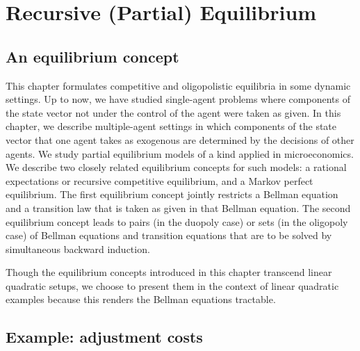 

%





\def\toone{{t+1}}
\def\ttwo{{t+2}}
\def\tthree{{t+3}}
\def\Tone{{T+1}}
\def\TTT{{T-1}}
\def\rtr{{\rm tr}}

\chapter{Recursive (Partial) Equilibrium \label{recurpe}}

\section{An equilibrium concept}

This chapter formulates competitive and oligopolistic
equilibria in some dynamic settings.
Up to now, we have studied  single-agent problems where
components of the state vector not under the control
of the agent were taken as given.  In this chapter, we
describe multiple-agent settings in which  components
of the state vector that one agent takes as exogenous are
determined by the decisions of other agents.   We study partial
equilibrium models of a kind applied in
microeconomics.    We describe
two closely related equilibrium  concepts for such models:
a rational expectations or recursive competitive  equilibrium,
and a Markov perfect equilibrium.   The first
equilibrium concept jointly restricts a Bellman equation and
a transition law that is taken as given in that Bellman
equation.  The second equilibrium concept leads
to pairs (in the duopoly case) or sets (in the oligopoly case)
 of Bellman equations  and transition equations that are  to be
solved by simultaneous backward induction.

   Though the equilibrium concepts introduced in this chapter
 transcend  linear quadratic setups, we choose to
present them in the context of linear quadratic examples
because this renders the    Bellman equations
 tractable.


\section{Example: adjustment costs}

